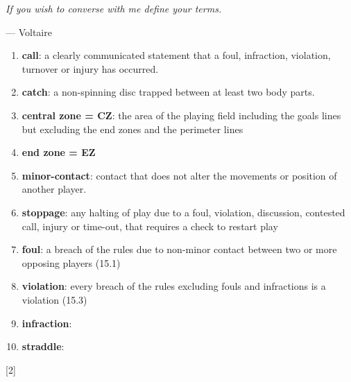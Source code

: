 \begin{flushright}
\begin{minipage}{9cm}
    \begin{flushleft} \emph{If you wish to converse with me define your terms.} \end{flushleft}
    \begin{flushright}--- Voltaire\end{flushright}
\end{minipage}
\end{flushright}

\small
\begin{enumerate}
    \item \textbf{call}: a clearly communicated statement that a foul, infraction, violation, turnover or injury has occurred.
    \item \textbf{catch}: a non-spinning disc trapped between at least two body parts.
    \item \textbf{central zone = CZ}: the area of the playing field including the goals lines but excluding the end zones and the perimeter lines
    \item \textbf{end zone = EZ}
    \item \textbf{minor-contact}: contact that does not alter the movements or position of another player.
    \item \textbf{stoppage}: any halting of play due to a foul, violation, discussion, contested call, injury or time-out, that requires a check to restart play
    \item \textbf{foul}: a breach of the rules due to non-minor contact between two or more opposing players (15.1)
    \item \textbf{violation}: every breach of the rules excluding fouls and infractions is a violation (15.3)
    \item \textbf{infraction}:
    \item \textbf{straddle}:
\end{enumerate}

\begin{center}[2]\end{center}
